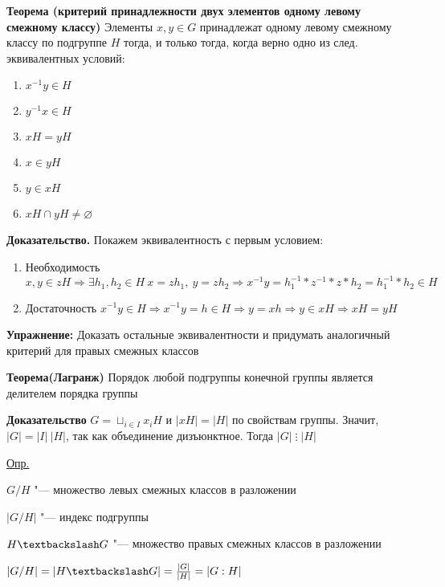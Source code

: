 \documentclass{article}
\begin{document}
\vspace{10pt}

\textbf{Теорема (критерий принадлежности двух элементов одному левому смежному классу)}
Элементы $x, y \in G$ принадлежат одному левому смежному классу по подгруппе $H$ тогда, и только тогда, когда верно одно из след. эквивалентных условий:
\begin{enumerate}
	\item $x^{-1}y \in H$
	\item $y^{-1}x \in H$
	\item $xH = yH$
	\item $x \in yH$
	\item $y \in xH$
	\item $xH \cap yH \neq \varnothing$	
\end{enumerate}
\textbf{Доказательство.}
Покажем эквивалентность с первым условием:
\begin{enumerate}
	\item Необходимость $x,y \in zH \Rightarrow \exists h_1, h_2 \in H \  x = zh_1, \  y = zh_2 \Rightarrow x^{-1}y = h_1^{-1}*z^{-1}*z*h_2 = h_1^{-1}*h_2 \in H$
	\item Достаточность
$x^{-1}y \in H \Rightarrow x^{-1}y = h \in H \Rightarrow y = xh \Rightarrow y \in xH \Rightarrow xH = yH$
\end{enumerate}

\textbf{Упражнение:} Доказать остальные эквивалентности и придумать аналогичный критерий для правых смежных классов

\vspace{10pt}

\textbf{Теорема(Лагранж)}
Порядок любой подгруппы конечной группы является делителем порядка группы

\textbf{Доказательство}
$G = \sqcup_{i \in I} x_iH$ и $|xH| = |H|$ по свойствам группы. Значит, $|G| = |I| \ |H|$, так как объединение дизъюнктное. Тогда $ |G| \mathrel{\vdots}  |H|$

\vspace{10pt}

\underline{Опр.}

$G/H$ "--- множество левых смежных классов в разложении

$ |G/H|$ "--- индекс подгруппы

$H \textbackslash G$ "--- множество правых смежных классов в разложении

$ |G/H| =  |H \textbackslash G| = \frac{|G|}{|H|} = |G : H|$

\vspace{10pt}
\end{document}

